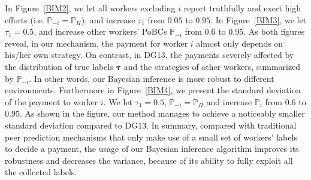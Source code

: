 In Figure~\ref{BIM2}, we let all workers excluding $i$ report truthfully and exert high efforts (i.e. $\mathbb{P}_{-i} = \mathbb{P}_H$), 
and increase $\tau_1$ from $0.05$ to $0.95$.
In Figure~\ref{BIM3}, we let $\tau_1=0.5$, and increase other workers' PoBCs $\mathbb{P}_{-i}$ from $0.6$ to $0.95$.
As both figures reveal, in our mechanism, the payment for worker $i$ almost only depends on his/her own strategy. On contrast, in DG13, the payments severely affected by the distribution of true labels $\bm{\tau}$ and the strategies of other workers, summarized by $\mathbb{P}_{-i}$.
In other words, our Bayesian inference is more robust to different environments.
Furthermore in Figure~\ref{BIM4}, we present the standard deviation of the payment to worker $i$.
We let $\tau_1=0.5$, $\mathbb{P}_{-i}=\mathbb{P}_H$ and increase $\mathbb{P}_i$ from $0.6$ to $0.95$.
As shown in the figure, our method manages to achieve a noticeably smaller standard deviation compared to DG13. 
In summary, compared with traditional peer prediction mechanisms that only make use of a small set of workers' labels to decide a payment, the usage of our Bayesian inference algorithm improves its robustness and decreases the variance, because of its ability to fully exploit all the collected labels. %



